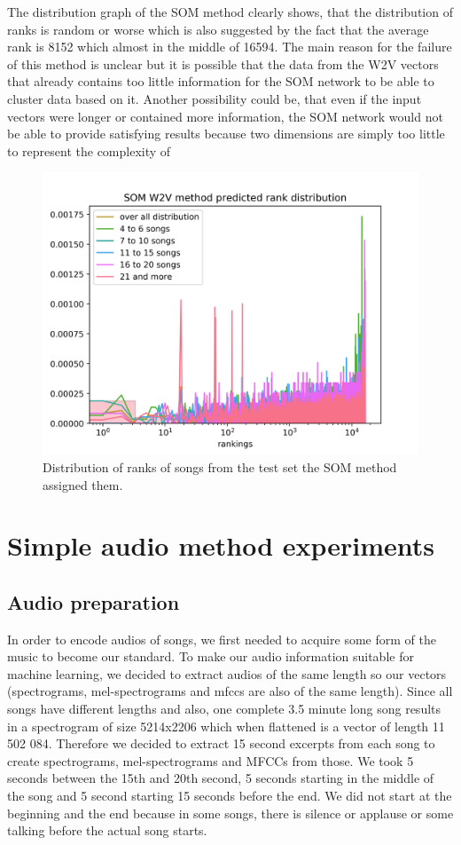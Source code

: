 The distribution graph of the SOM method clearly shows, that the distribution of ranks is random or worse which is also suggested by the fact that the average rank is 8152 which almost in the middle of 16594. The main reason for the failure of this method is unclear but it is possible that the data from the W2V vectors that already contains too little information for the SOM network to be able to cluster data based on it. Another possibility could be, that even if the input vectors were longer or contained more information, the SOM network would not be able to provide satisfying results because two dimensions are simply too little to represent the complexity of 
\begin{figure}[h]
    \centering
	\includegraphics[width=120mm]{./img/som_w2v_graph.png}
	\caption{Distribution of ranks of songs from the test set the SOM method assigned them.}
	\label{fig:som_distribution}
\end{figure}
\section{Simple audio method experiments}
\subsection{Audio preparation}\label{ssec:audio_prep}

In order to encode audios of songs, we first needed to acquire some form of the music to become our standard. To make our audio information suitable for machine learning, we decided to extract audios of the same length so our vectors (spectrograms, mel-spectrograms and mfccs are also of the same length). Since all songs have different lengths and also, one complete 3.5 minute long song results in a spectrogram of size 5214x2206 which when flattened is a vector of length 11 502 084. Therefore we decided to extract 15 second excerpts from each song to create spectrograms, mel-spectrograms and MFCCs from those. We took 5 seconds between the 15th and 20th second, 5 seconds starting in the middle of the song and 5 second starting 15 seconds before the end. We did not start at the beginning and the end because in some songs, there is silence or applause or some talking before the actual song starts. \\

